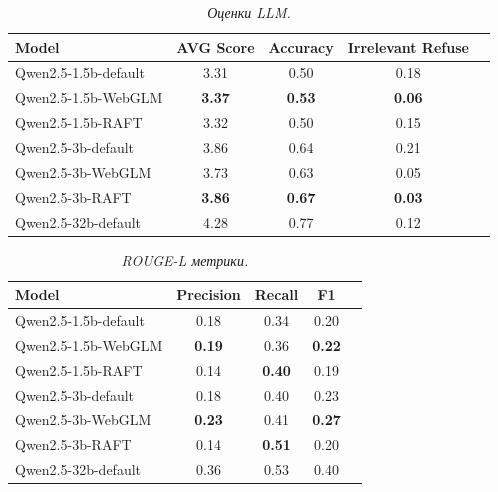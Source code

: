 \begin{table}[h]
\centering
\caption{\textit{Оценки LLM.}}
\renewcommand{\arraystretch}{1.0}  %
\begin{tabular}{@{}lcccc@{}}
\toprule
\textbf{Model} & \textbf{AVG Score} & \textbf{Accuracy} & \textbf{Irrelevant Refuse} \\
\midrule
Qwen2.5-1.5b-default        & 3.31              & 0.50                & 0.18             \\
Qwen2.5-1.5b-WebGLM       & \textbf{3.37}      & \textbf{0.53}      & \textbf{0.06}             \\
Qwen2.5-1.5b-RAFT        & 3.32              & 0.50                & 0.15             \\
Qwen2.5-3b-default          & 3.86     & 0.64                & 0.21             \\
Qwen2.5-3b-WebGLM       & 3.73              & 0.63                & 0.05             \\
Qwen2.5-3b-RAFT         & \textbf{3.86}     & \textbf{0.67}       & \textbf{0.03}    \\
Qwen2.5-32b-default       & 4.28            & 0.77                      & 0.12    \\
\bottomrule
\end{tabular}
\end{table}

\begin{table}[h]
\centering
\caption{\textit{ROUGE-L метрики.}}
\renewcommand{\arraystretch}{1.0}  %
\begin{tabular}{@{}lcccc@{}}
\toprule
\textbf{Model} & \textbf{Precision} & \textbf{Recall} & \textbf{F1}\\
\midrule
Qwen2.5-1.5b-default        & 0.18              & 0.34                & 0.20             \\
Qwen2.5-1.5b-WebGLM        & \textbf{0.19}       & 0.36        & \textbf{0.22}             \\
Qwen2.5-1.5b-RAFT        & 0.14              & \textbf{0.40}                & 0.19             \\
Qwen2.5-3b-default          & 0.18              & 0.40                & 0.23             \\
Qwen2.5-3b-WebGLM       & \textbf{0.23}     & 0.41                & \textbf{0.27}    \\
Qwen2.5-3b-RAFT         & 0.14              & \textbf{0.51}       & 0.20             \\
Qwen2.5-32b-default       & 0.36            & 0.53                      & 0.40    \\
\bottomrule
\end{tabular}
\end{table}


